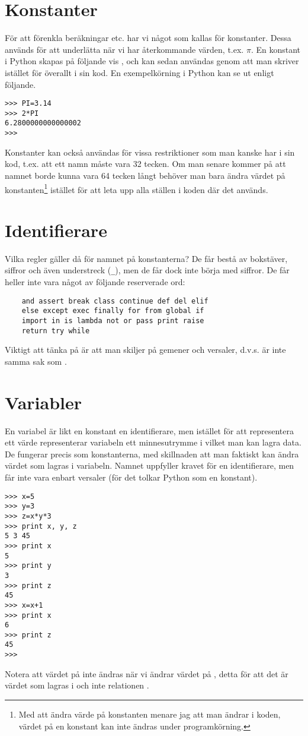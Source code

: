 \section{Konstanter}

För att förenkla beräkningar etc. har vi något som kallas för konstanter.
Dessa används för att underlätta när vi har återkommande värden, t.ex. \(\pi\).
En konstant i Python skapas på följande vis , och kan sedan
användas genom att man skriver  istället för  överallt i
sin kod. En exempelkörning i Python kan se ut enligt följande.
\begin{lstlisting}[style=text]
>>> PI=3.14
>>> 2*PI
6.2800000000000002
>>>
\end{lstlisting}

Konstanter kan också användas för vissa restriktioner som man kanske har i sin
kod, t.ex. att ett namn måste vara 32 tecken. Om man senare kommer på att
namnet borde kunna vara 64 tecken långt behöver man bara ändra värdet på
konstanten\footnote{Med att ändra värde på konstanten menare jag att man ändrar
i koden, värdet på en konstant kan inte ändras under programkörning.} istället
för att leta upp alla ställen i koden där det används.



\section{Identifierare}

Vilka regler gäller då för namnet på konstanterna? De får bestå av bokstäver,
siffror och även understreck (\verb'_'), men de får dock inte börja med
siffror. De får heller inte vara något av följande reserverade ord:
\begin{verbatim}
    and assert break class continue def del elif
    else except exec finally for from global if
    import in is lambda not or pass print raise
    return try while
\end{verbatim}
Viktigt att tänka på är att man skiljer på gemener och versaler, d.v.s.
 är inte samma sak som .



\section{Variabler}

En variabel är likt en konstant en identifierare, men istället för att
representera ett värde representerar variabeln ett minnesutrymme i vilket man
kan lagra data. De fungerar precis som konstanterna, med skillnaden att man
faktiskt kan ändra värdet som lagras i variabeln. Namnet uppfyller kravet för
en identifierare, men får inte vara enbart versaler (för det tolkar Python som
en konstant).
\begin{lstlisting}[style=text]
>>> x=5
>>> y=3
>>> z=x*y*3
>>> print x, y, z
5 3 45
>>> print x
5
>>> print y
3
>>> print z
45
>>> x=x+1
>>> print x
6
>>> print z
45
>>>
\end{lstlisting}
Notera att värdet på  inte ändras när vi ändrar värdet på ,
detta för att det är värdet  som lagras i  och inte relationen
.



